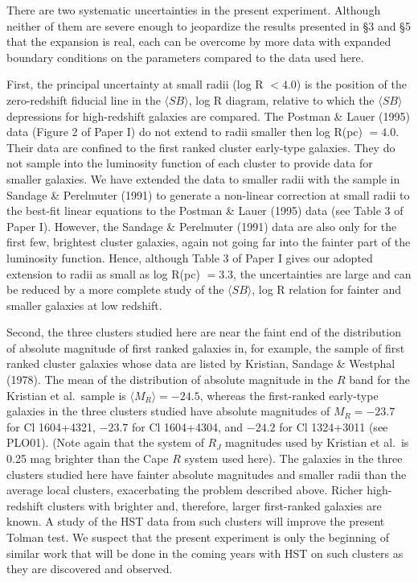 \documentclass[preprint]{aastex}
\begin{document}
There are two systematic uncertainties in the present experiment.
Although neither of them are severe enough to jeopardize the results
presented in \S3 and \S5 that the expansion is real, each can be
overcome by more data with expanded boundary conditions on the
parameters compared to the data used here.

First, the principal uncertainty at small radii (log R $< 4.0$) is the
position of the zero-redshift fiducial line in the $\langle SB
\rangle$, log R diagram, relative to which the $\langle SB \rangle$
depressions for high-redshift galaxies are compared. The Postman \&
Lauer (1995) data (Figure 2 of Paper I) do not extend to radii smaller
then log R(pc) $= 4.0$.  Their data are confined to the first ranked
cluster early-type galaxies. They do not sample into the luminosity
function of each cluster to provide data for smaller galaxies. We have
extended the data to smaller radii with the sample in Sandage \&
Perelmuter (1991) to generate a non-linear correction at small radii
to the best-fit linear equations to the Postman \& Lauer (1995) data
(see Table 3 of Paper I). However, the Sandage \& Perelmuter (1991)
data are also only for the first few, brightest cluster galaxies,
again not going far into the fainter part of the luminosity function.
Hence, although Table 3 of Paper I gives our adopted extension to
radii as small as log R(pc) $= 3.3$, the uncertainties are large and
can be reduced by a more complete study of the $\langle SB \rangle$,
log R relation for fainter and smaller galaxies at low redshift.

Second, the three clusters studied here are near the faint end of the
distribution of absolute magnitude of first ranked galaxies in, for
example, the sample of first ranked cluster galaxies whose data are
listed by Kristian, Sandage \& Westphal (1978). The mean of the
distribution of absolute magnitude in the $R$ band for the Kristian et
al.\ sample is $\langle M_R \rangle = -24.5$, whereas the first-ranked
early-type galaxies in the three clusters studied have absolute
magnitudes of $M_R = -23.7$ for Cl 1604+4321, $-23.7$ for Cl
1604+4304, and $-24.2$ for Cl 1324+3011 (see PLO01). (Note again that
the system of $R_J$ magnitudes used by Kristian et al.\ is 0.25 mag
brighter than the Cape $R$ system used here). The galaxies in the
three clusters studied here have fainter absolute magnitudes and
smaller radii than the average local clusters, exacerbating the
problem described above.  Richer high-redshift clusters with brighter
and, therefore, larger first-ranked galaxies are known. A study of the
HST data from such clusters will improve the present Tolman test. We
suspect that the present experiment is only the beginning of similar
work that will be done in the coming years with HST on such clusters
as they are discovered and observed.
\end{document}
